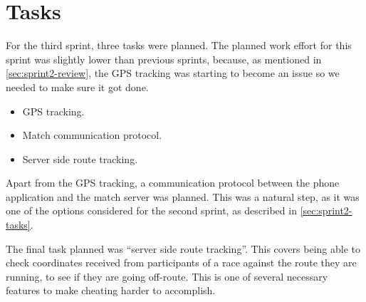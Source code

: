\section{Tasks}
\label{sec:sprint3-tasks}

For the third sprint, three tasks were planned. The planned work effort for this sprint was slightly lower than previous sprints, because, as mentioned in \autoref{sec:sprint2-review}, the \ac{GPS} tracking was starting to become an issue so we needed to make sure it got done.

\begin{itemize}
 \item \ac{GPS} tracking.
 \item Match communication protocol.
 \item Server side route tracking.
\end{itemize}

Apart from the \ac{GPS} tracking, a communication protocol between the phone application and the match server was planned. This was a natural step, as it was one of the options considered for the second sprint, as described in \autoref{sec:sprint2-tasks}.

The final task planned was ``server side route tracking''. This covers being able to check coordinates received from participants of a race against the route they are running, to see if they are going off-route. This is one of several necessary features to make cheating harder to accomplish.
